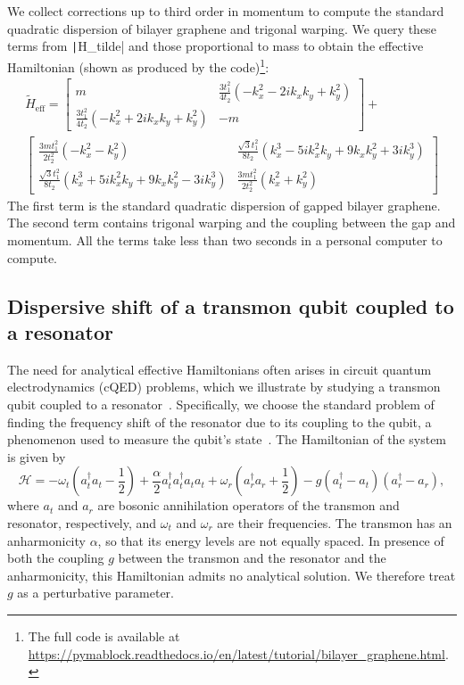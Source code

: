 We collect corrections up to third order in momentum to compute the standard quadratic dispersion of bilayer graphene and trigonal warping.
We query these terms from \texttt|H_tilde| and those proportional to mass to obtain the effective Hamiltonian (shown as produced by the code)\footnote{The full code is available at \url{https://pymablock.readthedocs.io/en/latest/tutorial/bilayer_graphene.html}.}:
%
{\small
\begin{gather}
\tilde{H}_{\textrm{eff}} =
\begin{bmatrix}
m & \frac{3 t_1^2}{4 t_2} ( - k_x^2 - 2ik_x k_y + k_y^2) \\
\frac{3 t_1^2}{4 t_2} ( - k_x^2 + 2ik_x k_y + k_y^2) & -m
\end{bmatrix} + \nonumber \\
\begin{bmatrix}
\frac{3 m t_1^2}{2 t_2^2} ( - k_x^2 - k_y^2) & \frac{\sqrt{3} t_1^2}{8 t_2} (k_x^3 - 5ik_x^2 k_y + 9 k_x k_y^2 + 3ik_y^3) \\
\frac{\sqrt{3} t_1^2}{8 t_2} (k_x^3 + 5ik_x^2 k_y + 9 k_x k_y^2 - 3ik_y^3) & \frac{3 m t_1^2}{2 t_2^2} (k_x^2 + k_y^2)
\end{bmatrix} \nonumber
\end{gather}
}
%
The first term is the standard quadratic dispersion of gapped bilayer graphene.
The second term contains trigonal warping and the coupling between the gap and momentum.
All the terms take less than two seconds in a personal computer to compute.

\subsection{Dispersive shift of a transmon qubit coupled to a resonator}
\label{sec:cqed}

The need for analytical effective Hamiltonians often arises in circuit quantum electrodynamics (cQED) problems, which we illustrate by studying a transmon qubit coupled to a resonator~\cite{Krantz_2019}.
Specifically, we choose the standard problem of finding the frequency shift of the resonator due to its coupling to the qubit, a phenomenon used to measure the qubit's state~\cite{Blais_2004}.
The Hamiltonian of the system is given by
%
\begin{equation}
    \label{eq:H_cqed}
    \mathcal{H} =
    -\omega_t (a^{\dagger}_{t} a_{t} - \frac{1}{2})
    + \frac{\alpha}{2} a^{\dagger}_{t} a^{\dagger}_{t} a_{t} a_{t} +
    \omega_r (a^{\dagger}_{r} a_{r} + \frac{1}{2}) -
    g (a^{\dagger}_{t} - a_{t}) (a^{\dagger}_{r} - a_{r}),
\end{equation}
%
where $a_t$ and $a_r$ are bosonic annihilation operators of the transmon and resonator, respectively, and $\omega_t$ and $\omega_r$ are their frequencies.
The transmon has an anharmonicity $\alpha$, so that its energy levels are not equally spaced.
In presence of both the coupling $g$ between the transmon and the resonator and the anharmonicity, this Hamiltonian admits no analytical solution.
We therefore treat $g$ as a perturbative parameter.

